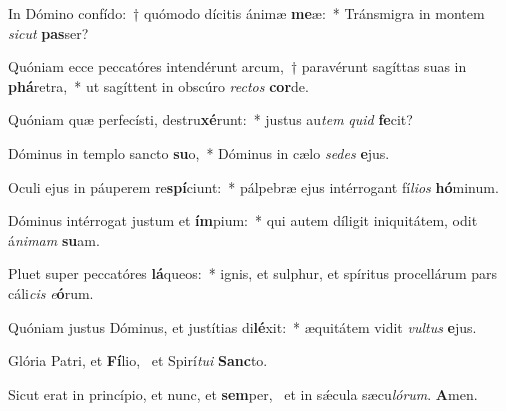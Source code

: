 \item In Dómino confído:~† quómodo dícitis ánimæ \textbf{me}æ:~* Tránsmigra in montem \textit{sic}\textit{ut} \textbf{pas}ser?
\item Quóniam ecce peccatóres intendérunt arcum,~† paravérunt sagíttas suas in \textbf{phá}retra,~* ut sagíttent in obscúro \textit{rec}\textit{tos} \textbf{cor}de.
\item Quóniam quæ perfecísti, destru\textbf{xé}runt:~* justus au\textit{tem} \textit{quid} \textbf{fe}cit?
\item Dóminus in templo sancto \textbf{su}o,~* Dóminus in cælo \textit{se}\textit{des} \textbf{e}jus.
\item Oculi ejus in páuperem re\textbf{spí}ciunt:~* pálpebræ ejus intérrogant fí\textit{li}\textit{os} \textbf{hó}minum.
\item Dóminus intérrogat justum et \textbf{ím}pium:~* qui autem díligit iniquitátem, odit á\textit{ni}\textit{mam} \textbf{su}am.
\item Pluet super peccatóres \textbf{lá}queos:~* ignis, et sulphur, et spíritus procellárum pars cáli\textit{cis} \textit{e}\textbf{ó}rum.
\item Quóniam justus Dóminus, et justítias di\textbf{lé}xit:~* æquitátem vidit \textit{vul}\textit{tus} \textbf{e}jus.
\item Glória Patri, et \textbf{Fí}lio,~\psstar{} et Spirí\textit{tu}\textit{i} \textbf{Sanc}to.
\item Sicut erat in princípio, et nunc, et \textbf{sem}per,~\psstar{} et in sǽcula sæcu\textit{ló}\textit{rum}. \textbf{A}men.
